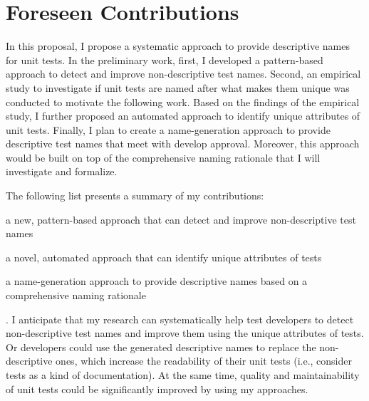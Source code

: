 \section{Foreseen Contributions}
\label{sec:contributions}

In this proposal, I propose a systematic approach to provide descriptive names for unit tests.
%
In the preliminary work, first, I developed a pattern-based approach to detect and improve non-descriptive test names.
%
Second, an empirical study to investigate if unit tests are named after what makes them unique was conducted to motivate the following work.
%
Based on the findings of the empirical study, I further proposed an automated approach to identify unique attributes of unit tests.
%
Finally, I plan to create a name-generation approach to provide descriptive test names that meet with develop approval.
%
Moreover, this approach would be built on top of the comprehensive naming rationale that I will investigate and formalize.

The following list presents a summary of my contributions:
\begin{enumerate*}
    \item a new, pattern-based approach that can detect and improve non-descriptive test names
    \item a novel, automated approach that can identify unique attributes of tests
    \item a name-generation approach to provide descriptive names based on a comprehensive naming rationale
\end{enumerate*}.
%
I anticipate that my research can systematically help test developers to detect non-descriptive test names and improve them using the unique attributes of tests.
%
Or developers could use the generated descriptive names to replace the non-descriptive ones, which increase the readability of their unit tests (i.e., consider tests as a kind of documentation).
%
At the same time, quality and maintainability of unit tests could be significantly improved by using my approaches.